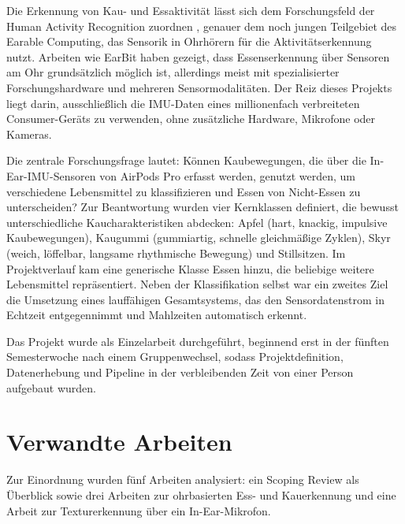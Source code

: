 \documentclass[11pt]{article}
\begin{document}
Die Erkennung von Kau- und Essaktivität lässt sich dem Forschungsfeld der Human Activity
Recognition zuordnen \citep[S.~33:1]{Bulling2014}, genauer dem noch jungen Teilgebiet des
\glqq Earable Computing\grqq, das Sensorik in Ohrhörern für die Aktivitätserkennung nutzt.
Arbeiten wie EarBit \citep{Bedri2017} haben gezeigt, dass Essenserkennung über Sensoren am
Ohr grundsätzlich möglich ist, allerdings meist mit spezialisierter Forschungshardware und
mehreren Sensormodalitäten. Der Reiz dieses Projekts liegt darin, ausschließlich die
IMU-Daten eines millionenfach verbreiteten Consumer-Geräts zu verwenden, ohne zusätzliche
Hardware, Mikrofone oder Kameras.

Die zentrale Forschungsfrage lautet: Können Kaubewegungen, die über die In-Ear-IMU-Sensoren
von AirPods Pro erfasst werden, genutzt werden, um verschiedene Lebensmittel zu
klassifizieren und Essen von Nicht-Essen zu unterscheiden? Zur Beantwortung wurden vier
Kernklassen definiert, die bewusst unterschiedliche Kaucharakteristiken abdecken: Apfel
(hart, knackig, impulsive Kaubewegungen), Kaugummi (gummiartig, schnelle gleichmäßige
Zyklen), Skyr (weich, löffelbar, langsame rhythmische Bewegung) und Stillsitzen. Im
Projektverlauf kam eine generische Klasse \glqq Essen\grqq{} hinzu, die beliebige weitere
Lebensmittel repräsentiert. Neben der Klassifikation selbst war ein zweites Ziel die
Umsetzung eines lauffähigen Gesamtsystems, das den Sensordatenstrom in Echtzeit
entgegennimmt und Mahlzeiten automatisch erkennt.

Das Projekt wurde als Einzelarbeit durchgeführt, beginnend erst in der fünften
Semesterwoche nach einem Gruppenwechsel, sodass Projektdefinition, Datenerhebung und
Pipeline in der verbleibenden Zeit von einer Person aufgebaut wurden.

\section{Verwandte Arbeiten}

Zur Einordnung wurden fünf Arbeiten analysiert: ein Scoping Review als Überblick sowie drei
Arbeiten zur ohrbasierten Ess- und Kauerkennung und eine Arbeit zur Texturerkennung über
ein In-Ear-Mikrofon.
\end{document}
